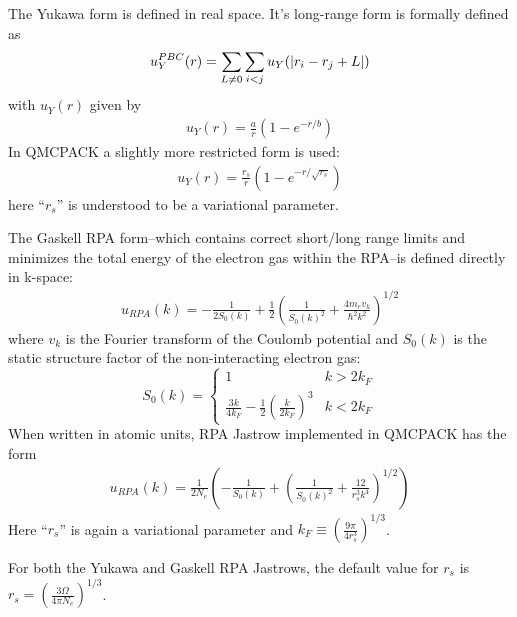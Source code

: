 The Yukawa form is defined in real space.  It's long-range form is 
formally defined as
\begin{align}
  u_Y^{PBC}(r) = \sum_{L\ne 0}\sum_{i<j}u_Y(\lvert r_i-r_j+L \rvert)
\end{align}
with $u_Y(r)$ given by
\begin{align}
  u_Y(r) = \frac{a}{r}\left(1-e^{-r/b}\right)
\end{align}
In QMCPACK a slightly more restricted form is used:
\begin{align}
  u_Y(r) = \frac{r_s}{r}\left(1-e^{-r/\sqrt{r_s}}\right)
\end{align}
here ``$r_s$'' is understood to be a variational parameter.

The Gaskell RPA form--which contains correct short/long range limits 
and minimizes the total energy of the electron gas within the RPA--is 
defined directly in k-space:
\begin{align}
  u_{RPA}(k) = -\frac{1}{2S_0(k)}+\frac{1}{2}\left(\frac{1}{S_0(k)^2}+\frac{4m_ev_k}{\hbar^2k^2}\right)^{1/2}
\end{align}
where $v_k$ is the Fourier transform of the Coulomb potential and 
$S_0(k)$ is the static structure factor of the non-interacting 
electron gas:
\[
  S_0(k) = \left.
  \begin{cases}
    1 &  k>2k_F \\
    \frac{3k}{4k_F}-\frac{1}{2}\left(\frac{k}{2k_F}\right)^3 & k<2k_F
  \end{cases}
  \right.
\]
When written in atomic units, RPA Jastrow implemented in QMCPACK has the 
form
\begin{align}
  u_{RPA}(k) = \frac{1}{2N_e}\left(-\frac{1}{S_0(k)}+\left(\frac{1}{S_0(k)^2}+\frac{12}{r_s^3k^4}\right)^{1/2}\right)
\end{align}
Here ``$r_s$'' is again a variational parameter and $k_F\equiv(\tfrac{9\pi}{4r_s^3})^{1/3}$.

For both the Yukawa and Gaskell RPA Jastrows, the default value for $r_s$ is $r_s=(\tfrac{3\Omega}{4\pi N_e})^{1/3}$.


